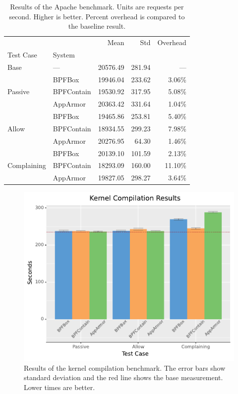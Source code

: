 \documentclass[
  fontsize=12pt,
  titlepage=firstiscover,
  paper=letter,
oneside,
  cleardoublepage=plain,
  parskip=half-,
  DIV=10,
  parindent,
  appendixprefix,
  chapterprefix,
  listof=totoc,
]{scrbook}
\begin{document}
\begin{table}[ht!]
\centering
\footnotesize
\caption[Results of the Apache benchmark]{Results of the Apache benchmark. Units are requests per second. Higher is better. Percent overhead is compared to the baseline result.}
\label{tab:phoronix-apache}
\begin{tabular}{llrrr}
\toprule
            &          &      Mean &     Std & Overhead \\
Test Case & System &           &         &          \\
\midrule
Base & --- &  20576.49 &  281.94 &      --- \\
\cline{1-5}
\multirow{3}{*}{Passive} & BPFBox &  19946.04 &  233.62 &   3.06\% \\
            & BPFContain &  19530.92 &  317.95 &   5.08\% \\
            & AppArmor &  20363.42 &  331.64 &   1.04\% \\
\cline{1-5}
\multirow{3}{*}{Allow} & BPFBox &  19465.86 &  253.81 &   5.40\% \\
            & BPFContain &  18934.55 &  299.23 &   7.98\% \\
            & AppArmor &  20276.95 &   64.30 &   1.46\% \\
\cline{1-5}
\multirow{3}{*}{Complaining} & BPFBox &  20139.10 &  101.59 &   2.13\% \\
            & BPFContain &  18293.09 &  160.00 &  11.10\% \\
            & AppArmor &  19827.05 &  298.27 &   3.64\% \\
\bottomrule
\end{tabular}
\end{table}


\begin{figure}[htp]
  \centering
  \includegraphics[width=0.6\linewidth]{results/graphs/Kernel-Compilation.pdf}
  \caption[Results of the kernel compilation benchmark]{
    Results of the kernel compilation benchmark.
    The error bars show standard deviation and the red line shows the base measurement.
    Lower times are better.
  }\label{fig:phoronix-kernel}
\end{figure}
\end{document}
